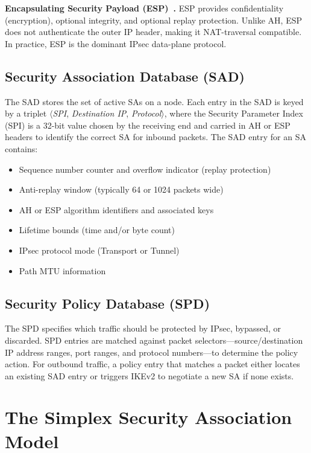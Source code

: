 \documentclass[sigconf,nonacm]{acmart}
\begin{document}
\textbf{Encapsulating Security Payload (ESP)~\cite{rfc4303}.} ESP provides
confidentiality (encryption), optional integrity, and optional replay protection.
Unlike AH, ESP does not authenticate the outer IP header, making it NAT-traversal
compatible. In practice, ESP is the dominant IPsec data-plane protocol.

\subsection{Security Association Database (SAD)}

The SAD stores the set of active SAs on a node. Each entry in the SAD is keyed by
a triplet $\langle$\textit{SPI}, \textit{Destination IP}, \textit{Protocol}$\rangle$,
where the Security Parameter Index (SPI) is a 32-bit value chosen by the receiving
end and carried in AH or ESP headers to identify the correct SA for inbound packets.
The SAD entry for an SA contains:

\begin{itemize}
  \item Sequence number counter and overflow indicator (replay protection)
  \item Anti-replay window (typically 64 or 1024 packets wide)
  \item AH or ESP algorithm identifiers and associated keys
  \item Lifetime bounds (time and/or byte count)
  \item IPsec protocol mode (Transport or Tunnel)
  \item Path MTU information
\end{itemize}

\subsection{Security Policy Database (SPD)}

The SPD specifies which traffic should be protected by IPsec, bypassed, or discarded.
SPD entries are matched against packet selectors---source/destination IP address
ranges, port ranges, and protocol numbers---to determine the policy action. For outbound
traffic, a policy entry that matches a packet either locates an existing SAD entry
or triggers IKEv2 to negotiate a new SA if none exists.

\section{The Simplex Security Association Model}
\label{sec:sa_model}
\end{document}

